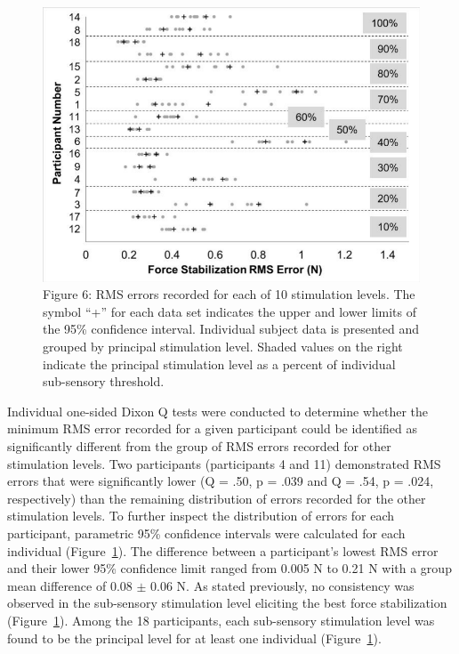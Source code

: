 \documentclass[]{cik}%
\begin{document}
\begin{figure}

{\centering \includegraphics[width=1\textwidth,height=\textheight]{./figures/fig6.pdf}

}

\caption{\label{fig-6}Figure 6: RMS errors recorded for each of 10
stimulation levels. The symbol ``+'' for each data set indicates the
upper and lower limits of the 95\% confidence interval. Individual
subject data is presented and grouped by principal stimulation level.
Shaded values on the right indicate the principal stimulation level as a
percent of individual sub-sensory threshold.}

\end{figure}

Individual one-sided Dixon Q tests were conducted to determine whether
the minimum RMS error recorded for a given participant could be
identified as significantly different from the group of RMS errors
recorded for other stimulation levels. Two participants (participants 4
and 11) demonstrated RMS errors that were significantly lower (Q = .50,
p = .039 and Q = .54, p = .024, respectively) than the remaining
distribution of errors recorded for the other stimulation levels. To
further inspect the distribution of errors for each participant,
parametric 95\% confidence intervals were calculated for each individual
(Figure~\ref{fig-6}). The difference between a participant's lowest RMS
error and their lower 95\% confidence limit ranged from 0.005 N to 0.21
N with a group mean difference of 0.08 \(\pm\) 0.06 N. As stated
previously, no consistency was observed in the sub-sensory stimulation
level eliciting the best force stabilization (Figure~\ref{fig-6}). Among
the 18 participants, each sub-sensory stimulation level was found to be
the principal level for at least one individual (Figure~\ref{fig-6}).
\end{document}
